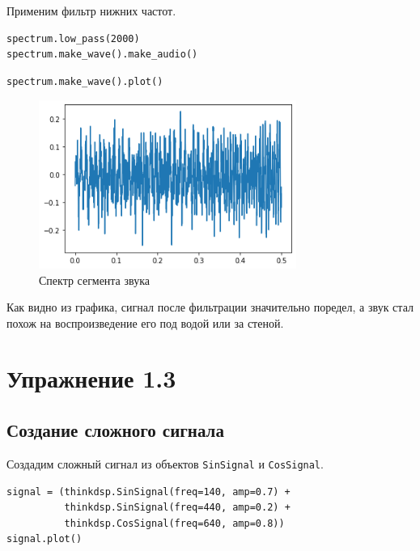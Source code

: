 \documentclass[a4paper,12pt]{report}
\begin{document}
Применим фильтр нижних частот.

\begin{lstlisting}[caption=Фильтрация и воспроизведение звука]
spectrum.low_pass(2000)
spectrum.make_wave().make_audio()
\end{lstlisting}

\begin{lstlisting}[caption=Визуализация фильтрации]
spectrum.make_wave().plot()
\end{lstlisting}

\begin{figure}[H]
        \centering
        \includegraphics[width=0.75\textwidth]{lab1_fig2_5.png}
        \caption{Спектр сегмента звука}
        \label{fig:lab1_fig2_5}
\end{figure}

Как видно из графика, сигнал после фильтрации значительно поредел, а звук стал похож на воспроизведение его под водой или за стеной.

\chapter{Упражнение 1.3}
\section{Создание сложного сигнала}

Создадим сложный сигнал из объектов \texttt{SinSignal} и \texttt{CosSignal}.

\begin{lstlisting}[caption=Создание сложного сигнала]
signal = (thinkdsp.SinSignal(freq=140, amp=0.7) +
          thinkdsp.SinSignal(freq=440, amp=0.2) +
          thinkdsp.CosSignal(freq=640, amp=0.8))
signal.plot()
\end{lstlisting}
\end{document}
